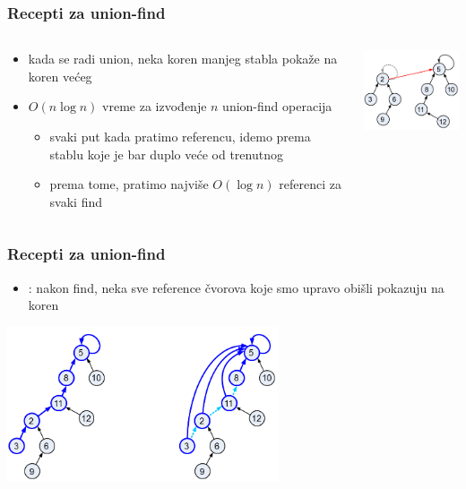 \documentclass[compress]{beamer}
\begin{document}
\begin{frame}[fragile]
  \frametitle{Recepti za union-find}
  \begin{columns}
    \begin{column}[t]{7cm}
      \begin{itemize}
        \item kada se radi union, neka koren manjeg stabla pokaže na
          koren većeg
        \item $O(n\log n)$ vreme za izvođenje $n$ union-find operacija
        \begin{itemize}
          \item svaki put kada pratimo referencu, idemo prema stablu
            koje je bar duplo veće od trenutnog
          \item prema tome, pratimo najviše $O(\log n)$ referenci za
            svaki find
        \end{itemize}
      \end{itemize}
    \end{column}
    \begin{column}[t]{5cm}
      \begin{center}
        \includegraphics[width=4.5cm]{asp-14-pic80.png}
      \end{center}
    \end{column}
  \end{columns}
\end{frame}

\begin{frame}[fragile]
  \frametitle{Recepti za union-find}
  \begin{itemize}
    \item {}: nakon find, neka sve reference
      čvorova koje smo upravo obišli pokazuju na koren
    \end{itemize}
  \begin{center}
    \includegraphics[width=8cm]{asp-14-pic81.png}
  \end{center}
\end{frame}
\end{document}
